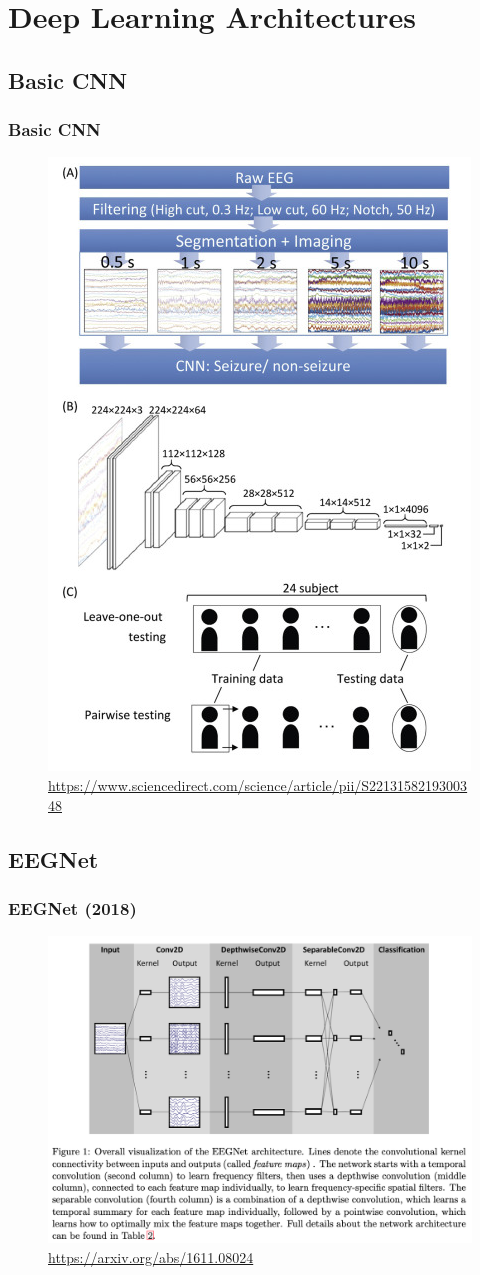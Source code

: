 \documentclass{beamer}
\begin{document}
\section{Deep Learning Architectures}

\subsection{Basic CNN}

\begin{frame}
\frametitle{Basic CNN}
\begin{figure}
	\includegraphics[width=0.35\linewidth]{image/basic}
	\caption{\url{https://www.sciencedirect.com/science/article/pii/S2213158219300348}}
\end{figure}
\end{frame}

\subsection{EEGNet}

\begin{frame}
\frametitle{EEGNet (2018)}
\begin{figure}
	\includegraphics[width=0.7\linewidth]{image/eegnet}
	\caption{\url{https://arxiv.org/abs/1611.08024}}
\end{figure}
\end{frame}
\end{document}
